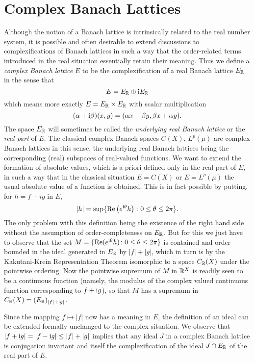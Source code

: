\section{Complex Banach Lattices}\label{sec:c1-7}

Although the notion of a Banach lattice is intrinsically related to the real number system, it is possible and often desirable to extend discussions to complexifications of Banach lattices in such a way that the order-related terms introduced in the real situation essentially retain their meaning.
Thus we define a \emph{complex Banach lattice} $ E $ to be the complexification of a real Banach lattice $ E_{\mathbb{R}} $ in the sense that
\[
E = E_{\mathbb{R}} \oplus \mathrm{i} E_{\mathbb{R}}
\]
which means more exactly $ E = E_{\mathbb{R}} \times E_{\mathbb{R}} $ with scalar multiplication 
%
\[
	 (\alpha+\mathrm{i}\beta)(x,y) = (\alpha x-\beta y,\beta x+\alpha y)  .
\]
%
The space $ E_{\mathbb{R}} $ will sometimes be called the \emph{underlying real Banach lattice} or the \emph{real part} of $ E $.
The classical complex Banach spaces $ C(X) $, $ L^{p}(\mu) $ are complex Banach lattices in this sense, the underlying real Banach lattices being the corresponding (real) subspaces of real-valued functions.
We want to extend the formation of absolute values, which is a priori defined only in the real part of $ E $, in such a way that in the classical situation $ E = C(X) $ or $ E = L^{p}(\mu) $ the usual absolute value of a function is obtained.
This is in fact possible by putting, for $ h = f + ig $ in $ E $,
\[
	|h| = \sup\{ \mathop{}\!\mathrm{Re}\left( e^{\mathrm{i}\theta}h \right) \colon 0 \leq \theta \leq 2\pi \}.
\]
The only problem with this definition being the existence of the right hand side without the assumption of order-completeness on $ E_{\mathbb{R}} $.
But for this we just have to observe that the set $ M = \{\mathop{}\!\mathrm{Re}(e^{\mathrm{i}\theta}h) \colon 0 \leq \theta \leq 2\pi\} $ is contained and order bounded in the ideal generated in $ E_{\mathbb{R}} $ by $ |f| + |g| $, which in turn is by the Kakutani-Krein Representation Theorem isomorphic to a space $ C_{\mathbb{R}}(X) $ under the pointwise ordering.
Now the pointwise supremum of $ M $ in $ \mathbb{R}^{X} $ is readily seen to be a continuous function (namely, the modulus of the complex valued continuous function corresponding to $ f + \mathrm{i} g $), so that $ M $ has a supremum in $ C_{\mathbb{R}}(X) = (E_{\mathbb{R}})_{|f|+|g|} $.

Since the mapping $ f \mapsto |f| $ now has a meaning in $ E $, the definition of an ideal can be extended formally unchanged to the complex situation.
We observe that $ |f+ \mathrm{i} g| = |f- \mathrm{i} g| \leq |f|+|g| $ implies that any ideal $ J $ in a complex Banach lattice is conjugation invariant and itself the complexification of the ideal $ J \cap E_{\mathbb{R}} $ of the real part of $ E $.

